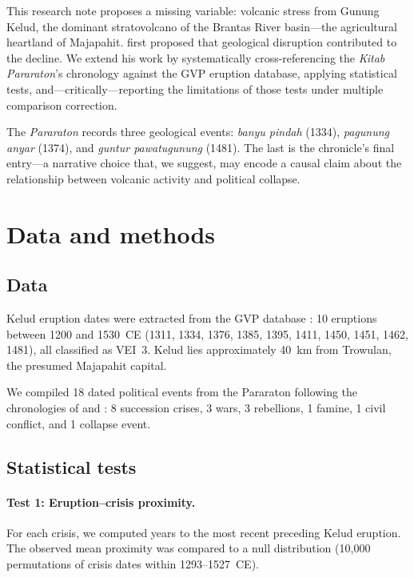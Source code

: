 \documentclass[12pt,a4paper]{article}
\begin{document}
This research note proposes a missing variable: volcanic stress from Gunung Kelud, the dominant stratovolcano of the Brantas River basin---the agricultural heartland of Majapahit.
\citet{satyana2015} first proposed that geological disruption contributed to the decline.
We extend his work by systematically cross-referencing the \textit{Kitab Pararaton}'s chronology against the GVP eruption database, applying statistical tests, and---critically---reporting the limitations of those tests under multiple comparison correction.

The \textit{Pararaton} records three geological events: \textit{banyu pindah} (1334), \textit{pagunung anyar} (1374), and \textit{guntur pawatugunung} (1481).
The last is the chronicle's final entry---a narrative choice that, we suggest, may encode a causal claim about the relationship between volcanic activity and political collapse.

\section{Data and methods}

\subsection{Data}

Kelud eruption dates were extracted from the GVP database \citep{gvp2024}: 10 eruptions between 1200 and 1530~CE (1311, 1334, 1376, 1385, 1395, 1411, 1450, 1451, 1462, 1481), all classified as VEI~3.
Kelud lies approximately 40~km from Trowulan, the presumed Majapahit capital.

We compiled 18 dated political events from the Pararaton following the chronologies of \citet{brandes1896} and \citet{pigeaud1967}: 8 succession crises, 3 wars, 3 rebellions, 1 famine, 1 civil conflict, and 1 collapse event.

\subsection{Statistical tests}

\paragraph{Test 1: Eruption--crisis proximity.}
For each crisis, we computed years to the most recent preceding Kelud eruption.
The observed mean proximity was compared to a null distribution (10{,}000 permutations of crisis dates within 1293--1527~CE).
\end{document}
